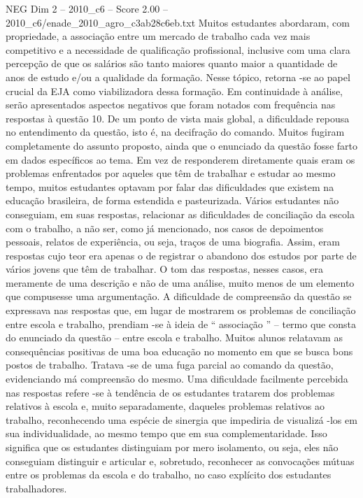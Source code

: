 \begin{textsample}{NEG Dim 2 – 2010\_c6 – Score 2.00 – 2010\_c6/enade\_2010\_agro\_c3ab28c6eb.txt}
Muitos estudantes abordaram, com propriedade, a associação entre um mercado de trabalho cada vez mais competitivo e a necessidade de qualificação profissional, inclusive com uma clara percepção de que os salários são tanto maiores quanto maior a quantidade de anos de estudo e/ou a qualidade da formação.
Nesse tópico, retorna -se ao papel crucial da EJA como viabilizadora dessa formação.
Em continuidade à análise, serão apresentados aspectos negativos que foram notados com frequência nas respostas à questão 10.
De um ponto de vista mais global, a dificuldade repousa no entendimento da questão, isto é, na decifração do comando.
Muitos fugiram completamente do assunto proposto, ainda que o enunciado da questão fosse farto em dados específicos ao tema.
Em vez de responderem diretamente quais eram os problemas enfrentados por aqueles que têm de trabalhar e estudar ao mesmo tempo, muitos estudantes optavam por falar das dificuldades que existem na educação brasileira, de forma estendida e pasteurizada.
Vários estudantes não conseguiam, em suas respostas, relacionar as dificuldades de conciliação da escola com o trabalho, a não ser, como já mencionado, nos casos de depoimentos pessoais, relatos de experiência, ou seja, traços de uma biografia.
Assim, eram respostas cujo teor era apenas o de registrar o abandono dos estudos por parte de vários jovens que têm de trabalhar.
O tom das respostas, nesses casos, era meramente de uma descrição e não de uma análise, muito menos de um elemento que compusesse uma argumentação.
A dificuldade de compreensão da questão se expressava nas respostas que, em lugar de mostrarem os problemas de conciliação entre escola e trabalho, prendiam -se à ideia de “ associação ” – termo que consta do enunciado da questão – entre escola e trabalho.
Muitos alunos relatavam as consequências positivas de uma boa educação no momento em que se busca bons postos de trabalho.
Tratava -se de uma fuga parcial ao comando da questão, evidenciando má compreensão do mesmo.
Uma dificuldade facilmente percebida nas respostas refere -se à tendência de os estudantes tratarem dos problemas relativos à escola e, muito separadamente, daqueles problemas relativos ao trabalho, reconhecendo uma espécie de sinergia que impediria de visualizá -los em sua individualidade, ao mesmo tempo que em sua complementaridade.
Isso significa que os estudantes distinguiam por mero isolamento, ou seja, eles não conseguiam distinguir e articular e, sobretudo, reconhecer as convocações mútuas entre os problemas da escola e do trabalho, no caso explícito dos estudantes trabalhadores.

\end{textsample}
